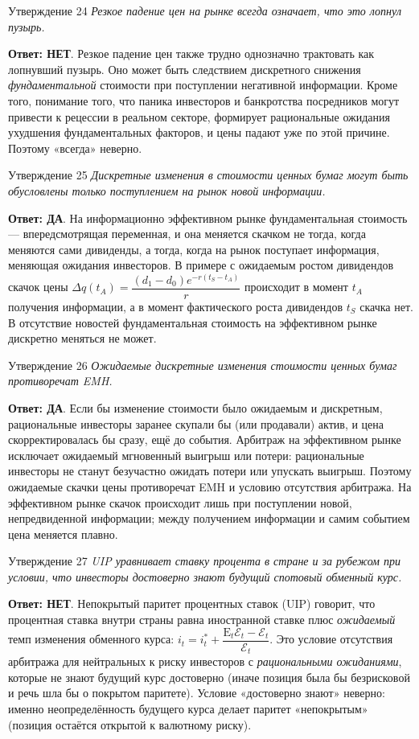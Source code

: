 \documentclass[10pt,a4paper]{article}
\newcommand{\qda}{\textbf{\color{yesgreen}Ответ: ДА}}
\newcommand{\qnet}{\textbf{\color{nored}Ответ: НЕТ}}
\newenvironment{answer}[2]{%
  \begin{qbox}{Утверждение #1}
  \textit{#2}\par\smallskip
}{%
  \end{qbox}\vspace{2pt}
}
\begin{document}
\begin{answer}{24}{Резкое падение цен на рынке всегда означает, что это лопнул пузырь.}
\qnet. Резкое падение цен также трудно однозначно трактовать как лопнувший пузырь. Оно может быть следствием дискретного снижения \emph{фундаментальной} стоимости при поступлении негативной информации. Кроме того, понимание того, что паника инвесторов и банкротства посредников могут привести к рецессии в реальном секторе, формирует рациональные ожидания ухудшения фундаментальных факторов, и цены падают уже по этой причине. Поэтому «всегда» неверно.
\end{answer}

\begin{answer}{25}{Дискретные изменения в стоимости ценных бумаг могут быть обусловлены только поступлением на рынок новой информации.}
\qda. На информационно эффективном рынке фундаментальная стоимость --- впередсмотрящая переменная, и она меняется скачком не тогда, когда меняются сами дивиденды, а тогда, когда на рынок поступает информация, меняющая ожидания инвесторов. В примере с ожидаемым ростом дивидендов скачок цены $\Delta q(t_A)=\dfrac{(d_1-d_0)e^{-r(t_S-t_A)}}{r}$ происходит в момент $t_A$ получения информации, а в момент фактического роста дивидендов $t_S$ скачка нет. В отсутствие новостей фундаментальная стоимость на эффективном рынке дискретно меняться не может.
\end{answer}

\begin{answer}{26}{Ожидаемые дискретные изменения стоимости ценных бумаг противоречат EMH.}
\qda. Если бы изменение стоимости было ожидаемым и дискретным, рациональные инвесторы заранее скупали бы (или продавали) актив, и цена скорректировалась бы сразу, ещё до события. Арбитраж на эффективном рынке исключает ожидаемый мгновенный выигрыш или потери: рациональные инвесторы не станут безучастно ожидать потери или упускать выигрыш. Поэтому ожидаемые скачки цены противоречат EMH и условию отсутствия арбитража. На эффективном рынке скачок происходит лишь при поступлении новой, непредвиденной информации; между получением информации и самим событием цена меняется плавно.
\end{answer}

\begin{answer}{27}{UIP уравнивает ставку процента в стране и за рубежом при условии, что инвесторы достоверно знают будущий спотовый обменный курс.}
\qnet. Непокрытый паритет процентных ставок (UIP) говорит, что процентная ставка внутри страны равна иностранной ставке плюс \emph{ожидаемый} темп изменения обменного курса: $i_t=i_t^*+\dfrac{\mathrm{E}_t\mathcal{E}_t-\mathcal{E}_t}{\mathcal{E}_t}$. Это условие отсутствия арбитража для нейтральных к риску инвесторов с \emph{рациональными ожиданиями}, которые не знают будущий курс достоверно (иначе позиция была бы безрисковой и речь шла бы о покрытом паритете). Условие «достоверно знают» неверно: именно неопределённость будущего курса делает паритет «непокрытым» (позиция остаётся открытой к валютному риску).
\end{answer}
\end{document}
